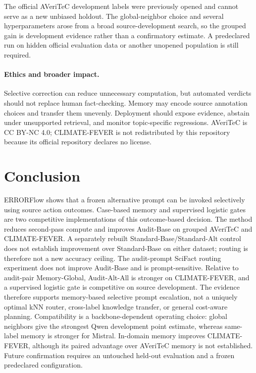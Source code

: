 \documentclass[runningheads]{llncs}
\begin{document}
The official AVeriTeC development labels were previously opened and cannot
serve as a new unbiased holdout. The global-neighbor choice and several
hyperparameters arose from a broad source-development search, so the grouped
gain is development evidence rather than a confirmatory estimate. A
predeclared run on hidden official evaluation data or another unopened
population is still required.

\paragraph{Ethics and broader impact.}
Selective correction can reduce unnecessary computation, but automated
verdicts should not replace human fact-checking. Memory may encode source
annotation choices and transfer them unevenly. Deployment should expose
evidence, abstain under unsupported retrieval, and monitor topic-specific
regressions. AVeriTeC is CC BY-NC 4.0; CLIMATE-FEVER is not redistributed by
this repository because its official repository declares no license.

\section{Conclusion}

ERRORFlow shows that a frozen alternative prompt can be invoked selectively
using source action outcomes. Case-based memory and supervised logistic gates
are two competitive implementations of this outcome-based decision. The method reduces second-pass
compute and improves Audit-Base on grouped AVeriTeC and
CLIMATE-FEVER. A separately rebuilt Standard-Base/Standard-Alt control does not
establish improvement over Standard-Base on either dataset;
routing is therefore not a new accuracy ceiling. The
audit-prompt SciFact routing experiment does not improve Audit-Base and is
prompt-sensitive. Relative to audit-pair Memory-Global, Audit-Alt-All
is stronger on CLIMATE-FEVER, and a supervised logistic
gate is competitive on source development. The evidence therefore supports
memory-based selective prompt escalation, not a uniquely optimal kNN router,
cross-label knowledge transfer, or general cost-aware planning. Compatibility
is a backbone-dependent operating choice: global neighbors give the strongest
Qwen development point estimate, whereas same-label memory is stronger for
Mistral. In-domain memory improves CLIMATE-FEVER, although its paired
advantage over AVeriTeC memory is not established. Future confirmation requires an
untouched held-out evaluation and a frozen predeclared configuration.
\end{document}
